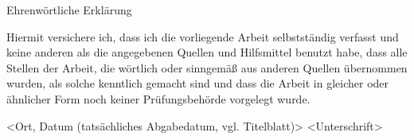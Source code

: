 \clearpage
{} %

\begin{center}
    \Large
    Ehrenwörtliche Erklärung
\end{center}
\vspace{1cm}

Hiermit versichere ich, dass ich die vorliegende Arbeit selbstständig verfasst und keine anderen als die angegebenen Quellen und Hilfsmittel benutzt habe, dass alle Stellen der Arbeit, die wörtlich oder sinngemäß aus anderen Quellen übernommen wurden, als solche kenntlich gemacht sind und dass die Arbeit in gleicher oder ähnlicher Form noch keiner Prüfungsbehörde vorgelegt wurde.

\vspace{2cm}

<Ort, Datum (tatsächliches Abgabedatum, vgl. Titelblatt)> \hspace{1.5cm} <Unterschrift>